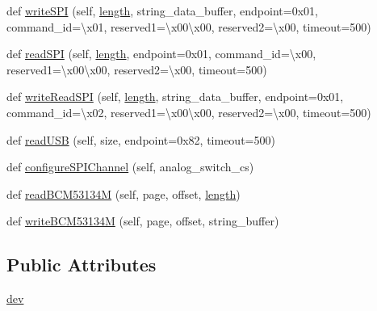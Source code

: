 \begin{DoxyCompactItemize}
\item 
def \hyperlink{classantenna__usb__rewrite__list_1_1_cp2130_aa06d5f9d42a353ede24a180b6fb544ce}{write\+S\+PI} (self, \hyperlink{namespaceantenna__usb__rewrite__list_a7db7584b8616ae6b6bbb5720a302001a}{length}, string\+\_\+data\+\_\+buffer, endpoint=0x01, command\+\_\+id=\textquotesingle{}\textbackslash{}x01\textquotesingle{}, reserved1=\textquotesingle{}\textbackslash{}x00\textbackslash{}x00\textquotesingle{}, reserved2=\textquotesingle{}\textbackslash{}x00\textquotesingle{}, timeout=500)
\item 
def \hyperlink{classantenna__usb__rewrite__list_1_1_cp2130_a2c69550993c63ae21902934163262033}{read\+S\+PI} (self, \hyperlink{namespaceantenna__usb__rewrite__list_a7db7584b8616ae6b6bbb5720a302001a}{length}, endpoint=0x01, command\+\_\+id=\textquotesingle{}\textbackslash{}x00\textquotesingle{}, reserved1=\textquotesingle{}\textbackslash{}x00\textbackslash{}x00\textquotesingle{}, reserved2=\textquotesingle{}\textbackslash{}x00\textquotesingle{}, timeout=500)
\item 
def \hyperlink{classantenna__usb__rewrite__list_1_1_cp2130_a75a72284ac12938f9ccc68da1686a5ad}{write\+Read\+S\+PI} (self, \hyperlink{namespaceantenna__usb__rewrite__list_a7db7584b8616ae6b6bbb5720a302001a}{length}, string\+\_\+data\+\_\+buffer, endpoint=0x01, command\+\_\+id=\textquotesingle{}\textbackslash{}x02\textquotesingle{}, reserved1=\textquotesingle{}\textbackslash{}x00\textbackslash{}x00\textquotesingle{}, reserved2=\textquotesingle{}\textbackslash{}x00\textquotesingle{}, timeout=500)
\item 
def \hyperlink{classantenna__usb__rewrite__list_1_1_cp2130_a803e2d831af752fabbddb827c049fd8d}{read\+U\+SB} (self, size, endpoint=0x82, timeout=500)
\item 
def \hyperlink{classantenna__usb__rewrite__list_1_1_cp2130_ad09266cdf8989135a43896a2e20cae7a}{configure\+S\+P\+I\+Channel} (self, analog\+\_\+switch\+\_\+cs)
\item 
def \hyperlink{classantenna__usb__rewrite__list_1_1_cp2130_a04f16e23baabea53bb5575fcc22c7e9e}{read\+B\+C\+M53134M} (self, page, offset, \hyperlink{namespaceantenna__usb__rewrite__list_a7db7584b8616ae6b6bbb5720a302001a}{length})
\item 
def \hyperlink{classantenna__usb__rewrite__list_1_1_cp2130_aaba35d5629b9d9422417805d62c86a4e}{write\+B\+C\+M53134M} (self, page, offset, string\+\_\+buffer)
\end{DoxyCompactItemize}
\subsection*{Public Attributes}
\begin{DoxyCompactItemize}
\item 
\hyperlink{classantenna__usb__rewrite__list_1_1_cp2130_ac5782dd8db2e069beb2a9946c30daebf}{dev}
\end{DoxyCompactItemize}


